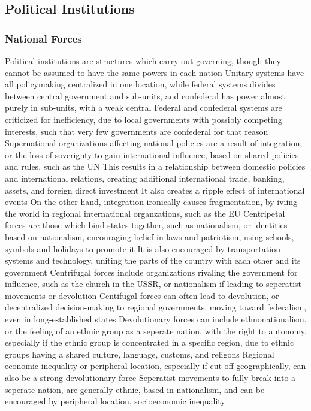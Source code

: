 \documentclass[11 pt, twoside]{article}
\newenvironment{outline*}
{
	\begin{outline}[enumerate]
	}
	{\end{outline}
}
\begin{document}
\subsection{Political Institutions}
\subsubsection{National Forces}
\begin{outline*}
\1 Political institutions are structures which carry out governing, though they cannot be assumed to have the same powers in each nation
\1 Unitary systems have all policymaking centralized in one location, while federal systems divides between central government and sub-units, and confederal has power almost purely in sub-units, with a weak central
\2 Federal and confederal systems are criticized for inefficiency, due to local governments with possibly competing interests, such that very few governments are confederal for that reason
\1 Supernational organizations affecting national policies are a result of integration, or the loss of soverignty to gain international influence, based on shared policies and rules, such as the UN
\2 This results in a relationship between domestic policies and international relations, creating additional international trade, banking, assets, and foreign direct investment
\2 It also creates a ripple effect of international events
\2 On the other hand, integration ironically causes fragmentation, by iviing the world in regional international organzations, such as the EU
\1 Centripetal forces are those which bind states together, such as nationalism, or identities based on nationalism, encouraging belief in laws and patriotism, using schools, symbols and holidays to promote it
\2 It is also encouraged by transportation systems and technology, uniting the parts of the country with each other and its government
\1 Centrifugal forces include organizations rivaling the government for  influence, such as the church in the USSR, or nationalism if leading to seperatist movements or devolution
\2 Centifugal forces can often lead to devolution, or decentralized decision-making to regional governments, moving toward federalism, even in long-established states
\3 Devolutionary forces can include ethnonationalism, or the feeling of an ethnic group as a seperate nation, with the right to autonomy, especially if the ethnic group is concentrated in a specific region, due to ethnic groups having a shared culture, language, customs, and religons
\3 Regional economic inequality or peripheral location, especially if cut off geographically, can also be a strong devolutionary force
\2 Seperatist movements to fully break into a seperate nation, are generally ethnic, based in nationalism, and can be encouraged by peripheral location, socioeconomic inequality
\end{outline*}
\end{document}
